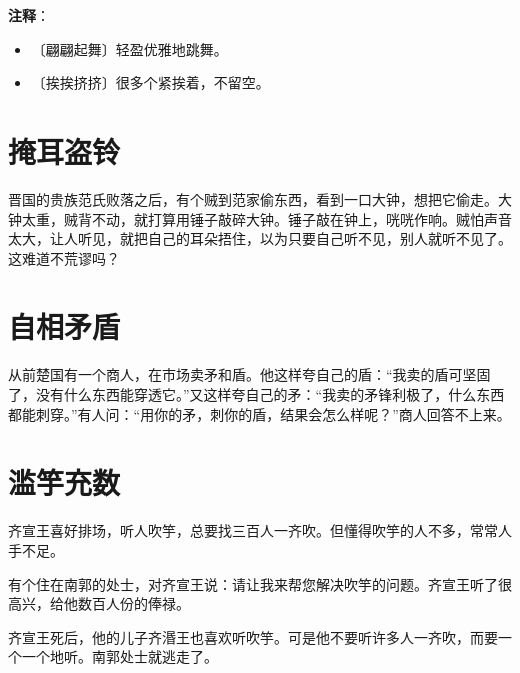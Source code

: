 \documentclass[12pt,UTF-8,openany]{ctexbook}
\begin{document}
\newpage

\textbf{注释}：

\vspace{-1em}

\begin{itemize}
    \setlength\itemsep{-0.2em}
    \item 〔翩翩起舞〕轻盈优雅地跳舞。
    \item 〔挨挨挤挤〕很多个紧挨着，不留空。
\end{itemize}

\chapter{掩耳盗铃}

\begin{large}
    
    晋国的贵族范氏败落之后，有个贼到范家偷东西，看到一口大钟，想把它偷走。大钟太重，贼背不动，就打算用锤子敲碎大钟。锤子敲在钟上，咣咣作响。贼怕声音太大，让人听见，就把自己的耳朵捂住，以为只要自己听不见，别人就听不见了。这难道不荒谬吗？
    
\end{large}



\chapter{自相矛盾}

\begin{large}
    
    从前楚国有一个商人，在市场卖矛和盾。他这样夸自己的盾：“我卖的盾可坚固了，没有什么东西能穿透它。”又这样夸自己的矛：“我卖的矛锋利极了，什么东西都能刺穿。”有人问：“用你的矛，刺你的盾，结果会怎么样呢？”商人回答不上来。
    
\end{large}



\chapter{滥竽充数}

\begin{large}
    
    齐宣王喜好排场，听人吹竽，总要找三百人一齐吹。但懂得吹竽的人不多，常常人手不足。
    
    有个住在南郭的处士，对齐宣王说：请让我来帮您解决吹竽的问题。齐宣王听了很高兴，给他数百人份的俸禄。
    
    齐宣王死后，他的儿子齐湣王也喜欢听吹竽。可是他不要听许多人一齐吹，而要一个一个地听。南郭处士就逃走了。
    
\end{large}
\end{document}
